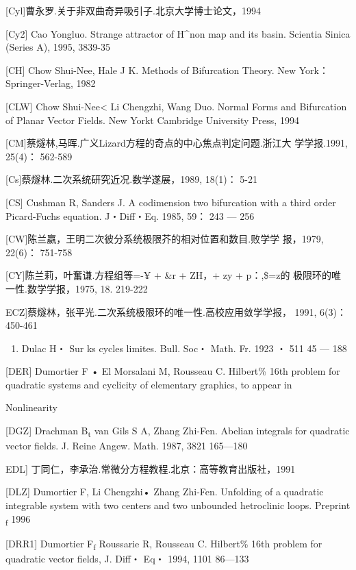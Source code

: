 \documentclass{article}
\begin{document}
{[}Cyl{]}曹永罗.关于非双曲奇异吸引子.北京大学博士论文，1994

{[}Cy2{]} Cao Yongluo. Strange attractor of H\^{}non map and its basin.
Scientia Sinica (Series A), 1995, 3839-35

{[}CH{]} Chow Shui-Nee, Hale J K. Methods of Bifurcation Theory. New
York： Springer-Verlag, 1982

{[}CLW{]} Chow Shui-Nee\textless{} Li Chengzhi, Wang Duo. Normal Forms
and Bifur­cation of Planar Vector Fields. New Yorkt Cambridge University
Press, 1994

{[}CM{]}蔡燧林,马晖.广义Lizard方程的奇点的中心焦点判定问题.浙江大
学学报.1991, 25(4)： 562-589

{[}Cs{]}蔡燧林.二次系统研究近况.数学遂展，1989, 18(1)： 5-21

{[}CS{]} Cushman R, Sanders J. A codimension two bifurcation with a
third or­der Picard-Fuchs equation. J・Diff・Eq. 1985, 59： 243 --- 256

{[}CW{]}陈兰嬴，王明二次彼分系统极限芥的相对位置和数目.败学学 报，1979,
22(6)： 751-758

{[}CY{]}陈兰莉，叶奮谦.方程组等=-¥ + \&r + ZH，+ zy + p：,\$=z的
极限环的唯一性.数学学报，1975, 18. 219-222

ECZ{]}蔡燧林，张平光.二次系统极限环的唯一性.高校应用敛学学报， 1991,
6(3)： 450-461

\begin{enumerate}
\def\labelenumi{\Alph{enumi}.}
\setcounter{enumi}{3}
\item
  Dulac H・ Sur ks cycles limites. Bull. Soc・ Math. Fr. 1923 ・ 511 45
  --- 188
\end{enumerate}

{[}DER{]} Dumortier F • El Morsalani M, Rousseau C. Hilbert\% 16th
problem for quadratic systems and cyclicity of elementary graphics, to
appear in

Nonlinearity

{[}DGZ{]} Drachman B\textsubscript{t} van Gils S A, Zhang Zhi-Fen.
Abelian integrals for quadratic vector fields. J. Reine Angew. Math.
1987, 3821 165---180

EDL{]} 丁同仁，李承治.常微分方程教程.北京：高等教育出版社，1991

{[}DLZ{]} Dumortier F, Li Chengzhi• Zhang Zhi-Fen. Unfolding of a
quadratic integrable system with two centers and two unbounded
hetroclinic loops. Preprint \textsubscript{f} 1996

{[}DRR1{]} Dumortier F\textsubscript{f} Roussarie R, Rousseau C.
Hilbert\% 16th problem for quadratic vector fields, J. Diff・ Eq・ 1994,
1101 86---133
\end{document}
